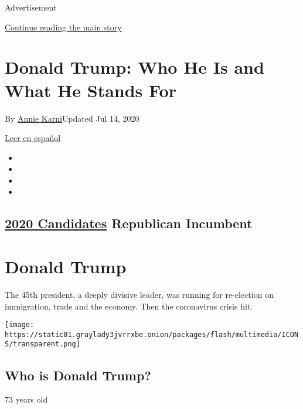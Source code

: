 Advertisement

\protect\hyperlink{after-top}{Continue reading the main story}

\hypertarget{donald-trump-who-he-is-and-what-he-stands-for}{%
\section{Donald Trump: Who He Is and What He Stands
For}\label{donald-trump-who-he-is-and-what-he-stands-for}}

By \href{https://www.nytimes3xbfgragh.onion/by/annie-karni}{Annie
Karni}Updated Jul 14, 2020

\href{https://www.nytimes3xbfgragh.onion/es/interactive/2020/espanol/estados-unidos/donald-trump-elecciones.html}{Leer
en español}

\begin{itemize}
\item
\item
\item
\item
\end{itemize}

\hypertarget{2020-candidates--republican-incumbent-}{%
\subsection{\texorpdfstring{\href{https://www.nytimes3xbfgragh.onion/interactive/2019/us/politics/2020-presidential-candidates.html}{2020
Candidates} Republican Incumbent
}{2020 Candidates  Republican Incumbent }}\label{2020-candidates--republican-incumbent-}}

\hypertarget{donald-trump}{%
\section{Donald Trump}\label{donald-trump}}

The 45th president, a deeply divisive leader, was running for
re-election on immigration, trade and the economy. Then the coronavirus
crisis hit.

\texttt{[image: https://static01.graylady3jvrrxbe.onion/packages/flash/multimedia/ICONS/transparent.png]}

\hypertarget{who-is-donald-trump}{%
\subsection{Who is Donald Trump?}\label{who-is-donald-trump}}

73 years old

